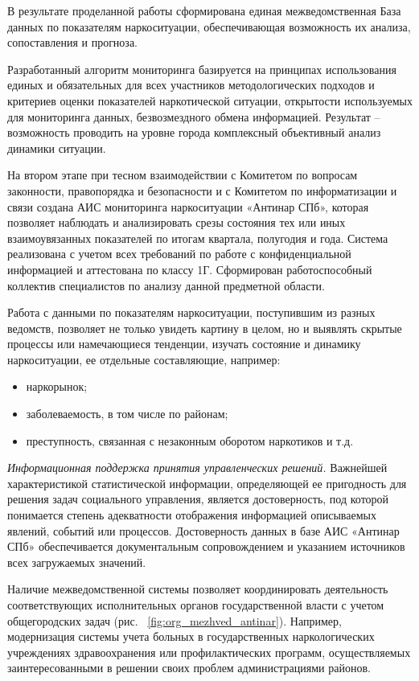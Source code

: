 В результате проделанной работы сформирована единая межведомственная База данных
по показателям наркоситуации, обеспечивающая возможность их анализа,
сопоставления и прогноза. 

Разработанный алгоритм мониторинга базируется на принципах использования единых
и обязательных для всех участников методологических подходов и критериев оценки
показателей наркотической ситуации, открытости используемых для мониторинга
данных, безвозмездного обмена информацией. Результат – возможность проводить на
уровне города комплексный объективный анализ динамики ситуации.

На втором этапе при тесном взаимодействии с Комитетом по вопросам законности,
правопорядка и безопасности и с Комитетом по информатизации и связи создана АИС
мониторинга наркоситуации «Антинар СПб», которая позволяет наблюдать и
анализировать срезы состояния тех или иных взаимоувязанных показателей по итогам
квартала, полугодия и года. Система реализована с учетом всех требований по
работе с конфиденциальной информацией и аттестована по классу 1Г. Сформирован
работоспособный коллектив специалистов по анализу данной предметной области.

Работа с данными по показателям наркоситуации, поступившим из разных ведомств,
позволяет не только увидеть картину в целом, но и выявлять скрытые процессы или
намечающиеся тенденции, изучать состояние и динамику наркоситуации, ее отдельные
составляющие, например:
\begin{itemize}
\item наркорынок; 
\item заболеваемость, в том числе по районам;
\item преступность, связанная с незаконным оборотом наркотиков и т.д.
\end{itemize}

\textit{Информационная поддержка принятия управленческих решений.}
Важнейшей характеристикой статистической информации, определяющей ее пригодность
для решения задач социального управления, является достоверность, под которой
понимается степень адекватности отображения информацией описываемых явлений,
событий или процессов. Достоверность данных в базе АИС «Антинар СПб»
обеспечивается документальным сопровождением и указанием источников всех
загружаемых значений.

Наличие межведомственной системы позволяет координировать деятельность
соответствующих исполнительных органов государственной власти с учетом
общегородских задач (рис. ~\ref{fig:org_mezhved_antinar}). Например,
модернизация системы учета больных в государственных наркологических учреждениях
здравоохранения или профилактических программ, осуществляемых заинтересованными
в решении своих проблем администрациями  районов.

